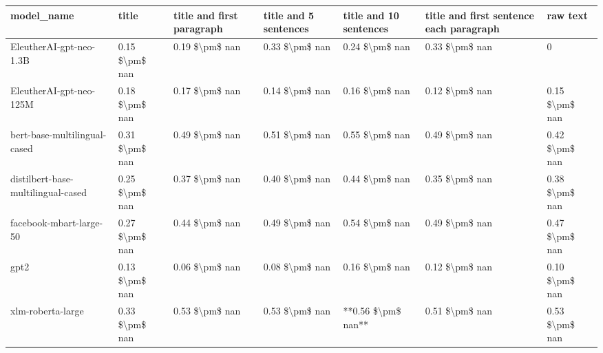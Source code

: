 \begin{tabular}{lllllll}
\toprule
                        model\_name &          title & title and first paragraph & title and 5 sentences & title and 10 sentences & title and first sentence each paragraph &       raw text \\
\midrule
           EleutherAI-gpt-neo-1.3B & 0.15 \$\textbackslash pm\$ nan &            0.19 \$\textbackslash pm\$ nan &        0.33 \$\textbackslash pm\$ nan &         0.24 \$\textbackslash pm\$ nan &                          0.33 \$\textbackslash pm\$ nan &              0 \\
           EleutherAI-gpt-neo-125M & 0.18 \$\textbackslash pm\$ nan &            0.17 \$\textbackslash pm\$ nan &        0.14 \$\textbackslash pm\$ nan &         0.16 \$\textbackslash pm\$ nan &                          0.12 \$\textbackslash pm\$ nan & 0.15 \$\textbackslash pm\$ nan \\
      bert-base-multilingual-cased & 0.31 \$\textbackslash pm\$ nan &            0.49 \$\textbackslash pm\$ nan &        0.51 \$\textbackslash pm\$ nan &         0.55 \$\textbackslash pm\$ nan &                          0.49 \$\textbackslash pm\$ nan & 0.42 \$\textbackslash pm\$ nan \\
distilbert-base-multilingual-cased & 0.25 \$\textbackslash pm\$ nan &            0.37 \$\textbackslash pm\$ nan &        0.40 \$\textbackslash pm\$ nan &         0.44 \$\textbackslash pm\$ nan &                          0.35 \$\textbackslash pm\$ nan & 0.38 \$\textbackslash pm\$ nan \\
           facebook-mbart-large-50 & 0.27 \$\textbackslash pm\$ nan &            0.44 \$\textbackslash pm\$ nan &        0.49 \$\textbackslash pm\$ nan &         0.54 \$\textbackslash pm\$ nan &                          0.49 \$\textbackslash pm\$ nan & 0.47 \$\textbackslash pm\$ nan \\
                              gpt2 & 0.13 \$\textbackslash pm\$ nan &            0.06 \$\textbackslash pm\$ nan &        0.08 \$\textbackslash pm\$ nan &         0.16 \$\textbackslash pm\$ nan &                          0.12 \$\textbackslash pm\$ nan & 0.10 \$\textbackslash pm\$ nan \\
                 xlm-roberta-large & 0.33 \$\textbackslash pm\$ nan &            0.53 \$\textbackslash pm\$ nan &        0.53 \$\textbackslash pm\$ nan &     **0.56 \$\textbackslash pm\$ nan** &                          0.51 \$\textbackslash pm\$ nan & 0.53 \$\textbackslash pm\$ nan \\
\bottomrule
\end{tabular}
